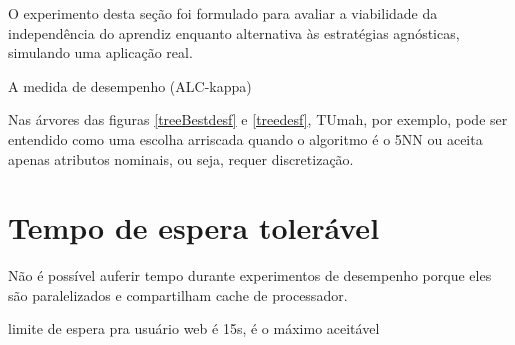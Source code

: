O experimento desta seção foi formulado para avaliar a viabilidade da independência do aprendiz
enquanto alternativa às estratégias agnósticas, simulando uma aplicação real.

A medida de desempenho (ALC-kappa) 

Nas árvores das figuras \ref{treeBestdesf} e  \ref{treedesf},
TUmah, por exemplo, pode ser entendido como uma escolha arriscada
quando o algoritmo é o 5NN ou aceita apenas atributos nominais, ou seja, requer discretização.


\section{Tempo de espera tolerável}


Não é possível auferir tempo durante experimentos de desempenho porque eles são
paralelizados e compartilham cache de processador.

limite de espera pra usuário web é 15s, é o máximo aceitável
\citep{conf/amcis/Nah03}

% 
% 

